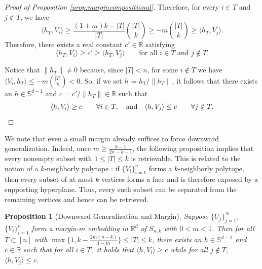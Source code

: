 \documentclass[preprint]{article}
\newtheorem{proposition}{Proposition}[]
\newcommand{\ksparsen}{S_{n,k}}
\begin{document}
\begin{proof}[Proof of Proposition \ref{prop:margincompositional}]
Therefore, for every $i \in T$ and $j \notin T$, we have
$$
\langle h_T, V_i\rangle
\geq
\frac{(1+m)k - |T|}{|T|}\binom{|T|}{k}
\geq
-m\binom{|T|}{k}
\geq
\langle h_T, V_j\rangle.
$$
Therefore, there exists a real constant $c' \in \mathbb{R}$ satisfying
$$
\langle h_T, V_i\rangle \geq c' \geq \langle h_T, V_j\rangle
\qquad
\text{for all } i \in T \text{ and } j \notin T.
$$

Notice that $\|h_T\| \neq 0$ because, since $|T| < n$, for some $i \notin T$ we have $\langle V_i, h_T \rangle \leq -m\binom{|T|}{k} < 0$. So, if we set $h\coloneqq h_T/\|h_T\|$, it follows that there exists an $h \in \mathbb{S}^{d-1}$ and $c = c'/\|h_T\|\in \mathbb{R}$ such that 
$$\langle h, V_i\rangle \geq c \qquad \forall i \in T, \quad \text{and}\quad \langle h, V_j\rangle \leq c \qquad \forall j \notin T.\qedhere$$
\end{proof}


We note that even a small margin already suffices to force downward generalization. Indeed, once $m \geq \frac{k -1 }{2n - k - 1}$, the following proposition implies that every nonempty subset with $1 \leq |T| \leq k$ is retrievable. This is related to the notion of a $k$-neighborly polytope \cite{grunbaum1967convex}: if $\{V_i\}_{i = 1}^n$ forms a $k$-neighborly polytope, then every subset of at most $k$ vertices forms a face and is therefore exposed by a supporting hyperplane. Thus, every such subset can be separated from the remaining vertices and hence can be retrieved.

\begin{proposition}[Downward Generalization and Margin]
\label{prop:margindownward}
Suppose $\{U_j\}_{j = 1}^N$, $\{V_i\}_{i = 1}^n$ form a margin-$m$ embedding in $\mathbb{R}^d$ of $\ksparsen$ with $0 < m < 1$. Then for all $T \subset [n]$ with $\max\{1, k - \frac{2m(n-k)}{1-m}\} \leq |T| \leq k$, there exists an $h \in \mathbb{S}^{d-1}$ and $c \in \mathbb{R}$ such that for all $i\in T,$
it holds that 
$\langle h, V_i\rangle \geq c$ while for all $j \not \in T,$
$\langle h, V_j\rangle \leq c.$
\end{proposition}
\end{document}
